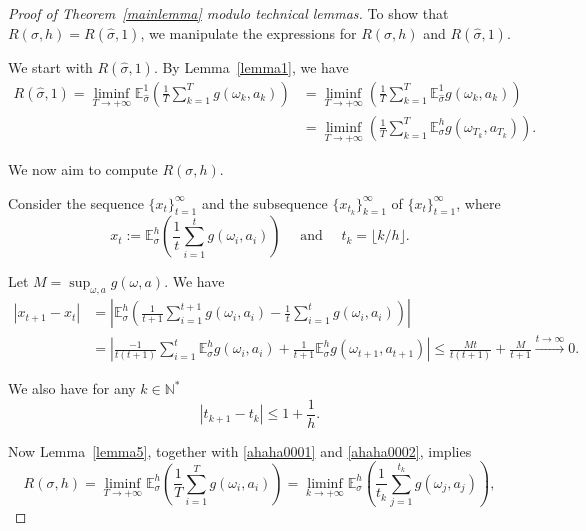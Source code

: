 \documentclass[english,openary,11pt]{article}
\theoremstyle{definition}
\newcommand{\N}{\mathbb{N}}
\newcommand{\E}{\mathbb{E}}
\begin{document}
\begin{proof}[Proof of Theorem~\ref{mainlemma} modulo technical lemmas]
To show that $R(\sigma, h) = R(\widehat \sigma, 1)$, we manipulate the expressions for $R(\sigma, h)$ and $R(\widehat \sigma, 1)$.

We start with $R(\widehat \sigma, 1)$. By Lemma~\ref{lemma1}, we have
\begin{equation}
\begin{aligned}
R(\widehat \sigma, 1) = \liminf_{T \to +\infty} \E_{\widehat \sigma}^1 \left( \frac{1}{T} \sum_{k = 1}^{T} g(\omega_k, a_k) \right) 
&= \liminf_{T \to +\infty} \left( \frac{1}{T} \sum_{k = 1}^{T} \E_{\widehat \sigma}^1 g(\omega_k, a_k) \right) \\
&= \liminf_{T \to +\infty} \left( \frac{1}{T} \sum_{k = 1}^{T} \E_\sigma^h g(\omega_{T_k}, a_{T_k}) \right).
\end{aligned}
\label{ahaha5}
\end{equation}


We now aim to compute $R(\sigma, h).$ 

Consider the sequence $\{x_t\}_ {t=1}^\infty$ and the subsequence $\{x_{t_k}\}_ {k=1}^\infty$ of $\{x_t\}_ {t=1}^\infty$, where
$$x_t := \E_{\sigma}^h \left( \frac{1}{t} \sum_{i = 1}^{t} g(\omega_i, a_i) \right) \quad \text{ and } \quad t_k = \lfloor k/h \rfloor.$$

Let $M=\sup_{\omega, a} g(\omega, a)$. We have 
\begin{equation}
\begin{aligned}
\left|x_{t+1} - x_t\right| 
&=
\left|\E_{\sigma}^h \left( \frac{1}{t+1} \sum_{i = 1}^{t+1} g(\omega_i, a_i) - \frac{1}{t} \sum_{i = 1}^{t} g(\omega_i, a_i) \right) \right|  \\
&=
\left|\frac{-1}{t(t+1)} \sum_{i = 1}^{t} \E_{\sigma}^h g(\omega_i, a_i) + \frac{1}{t+1} \E_{\sigma}^h g(\omega_{t+1}, a_{t+1})\right| \le \frac{M t}{t(t+1)} + \frac{M}{t+1} \xrightarrow{t \to \infty} 0.
\end{aligned}
\label{ahaha0001}
\end{equation}

We also have for any $k \in \N^*$
\begin{equation}
\left|t_{k+1} - t_k\right| \le 1 + \frac 1 h.
\label{ahaha0002}
\end{equation}

Now Lemma~\ref{lemma5}, together with \eqref{ahaha0001} and \eqref{ahaha0002}, implies
\begin{equation}
R(\sigma, h) = \liminf_{T \to +\infty} \E_{\sigma}^h \left( \frac{1}{T} \sum_{i = 1}^{T} g(\omega_i, a_i) \right) = \liminf_{k \to +\infty} \E_{\sigma}^h\left( \frac{1}{t_k} \sum_{j = 1}^{t_k} g(\omega_j, a_j) \right),
\label{ahaha0}
\end{equation}


\end{proof}
\end{document}
